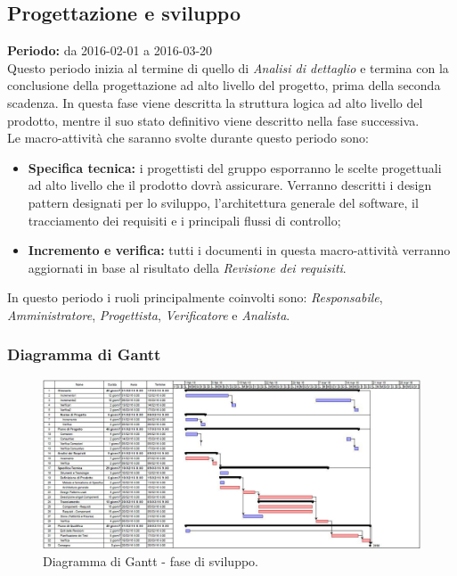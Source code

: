 \documentclass[a4paper]{article}
\begin{document}
		\subsection{Progettazione e sviluppo}
			\textbf{Periodo:} da 2016-02-01 a 2016-03-20 \\
			Questo periodo inizia al termine di quello di \emph{Analisi di dettaglio} e termina con la conclusione 
			della progettazione ad alto livello del progetto, prima della seconda scadenza. In questa fase viene 
			descritta la struttura logica ad alto livello del prodotto, mentre il suo stato definitivo viene 
			descritto nella fase successiva. \\
			Le macro-attività che saranno svolte durante questo periodo sono:
			\begin{itemize}
				\item \textbf{Specifica tecnica:} i progettisti del gruppo esporranno le scelte progettuali ad alto 
				livello che il prodotto dovrà assicurare. Verranno descritti i design pattern designati per lo sviluppo, 
				l'architettura generale del software, il tracciamento dei requisiti e i principali flussi di controllo;
				\item \textbf{Incremento e verifica:} tutti i documenti in questa macro-attività verranno aggiornati in base 
				al risultato della \emph{Revisione dei requisiti}.
			\end{itemize}
			In questo periodo i ruoli principalmente coinvolti sono: \emph{Responsabile}, \emph{Amministratore},
			\emph{Progettista}, \emph{Verificatore} e  \emph{Analista}.

			\subsubsection{Diagramma di Gantt}
				\begin{figure}[H]
					\centering
					\includegraphics[width=\textwidth]{gantt_sviluppo}
					\caption{Diagramma di Gantt - fase di sviluppo.}
				\end{figure}
\end{document}
